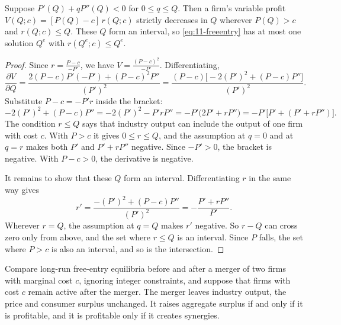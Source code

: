 \begin{lemma}\label{lem:11-freeentry}
Suppose $P'(Q) + qP''(Q) < 0$ for $0 \le q \le Q$. Then a firm's variable profit $V(Q; c) = [P(Q) - c]\,r(Q; c)$
strictly decreases in $Q$ wherever $P(Q) > c$ and $r(Q; c) \le Q$. These $Q$ form an interval, so
\eqref{eq:11-freeentry} has at most one solution $Q^e$ with $r(Q^e; c) \le Q^e$.
\end{lemma}

\begin{proof}
Since $r = \frac{P - c}{-P'}$, we have $V = \frac{(P - c)^2}{-P'}$. Differentiating,
\begin{equation*}
\frac{\partial V}{\partial Q} = \frac{2(P - c)P'(-P') + (P - c)^2P''}{(P')^2}
= \frac{(P - c)\big[-2(P')^2 + (P - c)P''\big]}{(P')^2} .
\end{equation*}
Substitute $P - c = -P'r$ inside the bracket:
\begin{equation*}
-2(P')^2 + (P - c)P'' = -2(P')^2 - P'rP'' = -P'\big(2P' + rP''\big) = -P'\big[P' + (P' + rP'')\big] .
\end{equation*}
The condition $r \le Q$ says that industry output can include the output of one firm with cost $c$. With $P > c$ it
gives $0 \le r \le Q$, and the assumption at $q = 0$ and at $q = r$ makes both $P'$ and $P' + rP''$ negative. Since $-P' > 0$, the
bracket is negative. With $P - c > 0$, the derivative is negative.

It remains to show that these $Q$ form an interval. Differentiating $r$ in the same way gives
\begin{equation*}
r' = \frac{-(P')^2 + (P - c)P''}{(P')^2} = -\frac{P' + rP''}{P'} .
\end{equation*}
Wherever $r = Q$, the assumption at $q = Q$ makes $r'$ negative. So $r - Q$ can cross zero only from above, and the
set where $r \le Q$ is an interval. Since $P$ falls, the set where $P > c$ is also an interval, and so is the
intersection.
\end{proof}

\begin{proposition}\label{prop:11-freeentry}
Compare long-run free-entry equilibria before and after a merger of two firms with marginal cost $c$, ignoring integer
constraints, and suppose that firms with cost $c$ remain active after the merger. The merger leaves industry output, the price and consumer
surplus unchanged. It raises aggregate surplus if and only if it is profitable, and it is profitable only if it
creates synergies.
\end{proposition}

